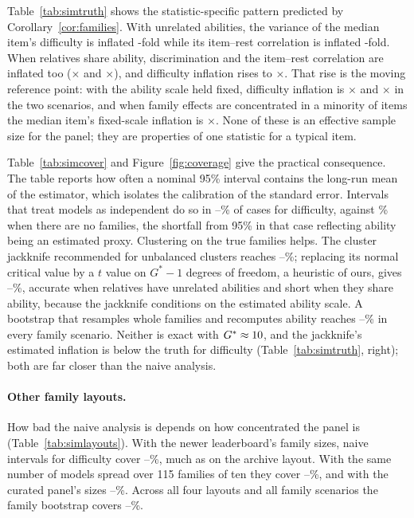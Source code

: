 \documentclass[10pt]{article}
\theoremstyle{remark}\newtheorem{remark}{Remark}
\begin{document}
Table~\ref{tab:simtruth} shows the statistic-specific pattern predicted by
Corollary~\ref{cor:families}. With unrelated abilities, the variance of the
median item's difficulty is inflated \SimTrueDiffUnrel-fold while its
item--rest correlation is inflated \SimTrueItemRestUnrel-fold. When relatives
share ability, discrimination and the item--rest correlation are inflated too
(\SimTrueDiscrShared$\times$ and \SimTrueItemRestShared$\times$), and
difficulty inflation rises to \SimTrueDiffShared$\times$. That rise is the
moving reference point: with the ability scale held fixed, difficulty
inflation is \SimFixDiffUnrel$\times$ and \SimFixDiffShared$\times$ in the two
scenarios, and when family effects are concentrated in a minority of items the
median item's fixed-scale inflation is \SimUnevenFix$\times$. None of these is an effective sample size for the panel; they are
properties of one statistic for a typical item.

Table~\ref{tab:simcover} and Figure~\ref{fig:coverage} give the practical
consequence. The table reports how often a nominal 95\% interval contains the
long-run mean of the estimator, which isolates the calibration of the standard
error. Intervals that treat models as independent do so in
\SimNaiveCoverShared--\SimNaiveCoverUnrel\% of cases for difficulty, against
\SimNullNaive\% when there are no families, the shortfall from 95\% in that
case reflecting ability being an estimated proxy. Clustering on the true
families helps. The cluster jackknife recommended for unbalanced clusters
\citep{mackinnon2023cluster} reaches \SimCRCoverLo--\SimCRCoverHi\%; replacing
its normal critical value by a $t$ value on $G^\ast-1$ degrees of freedom, a
heuristic of ours, gives \SimTCoverLo--\SimTCoverHi\%, accurate when
relatives have unrelated abilities and short when they share ability, because
the jackknife conditions on the estimated ability scale. A bootstrap that
resamples whole families and recomputes ability reaches
\SimBootCoverLo--\SimBootCoverHi\% in every family scenario. Neither is exact
with $G^\ast\approx10$, and the jackknife's estimated inflation
is below the truth for difficulty (Table~\ref{tab:simtruth}, right); both are
far closer than the naive analysis.

\paragraph{Other family layouts.}
How bad the naive analysis is depends on how concentrated the panel is
(Table~\ref{tab:simlayouts}). With the newer leaderboard's family sizes,
naive intervals for difficulty cover \LayNewerLo--\LayNewerHi\%, much as on
the archive layout. With the same number of models spread over 115 families
of ten they cover \LayBalancedLo--\LayBalancedHi\%, and with the curated
panel's sizes \LayCuratedLo--\LayCuratedHi\%. Across all four layouts and
all family scenarios the family bootstrap covers
\LayBootLo--\LayBootHi\%.

\end{document}
